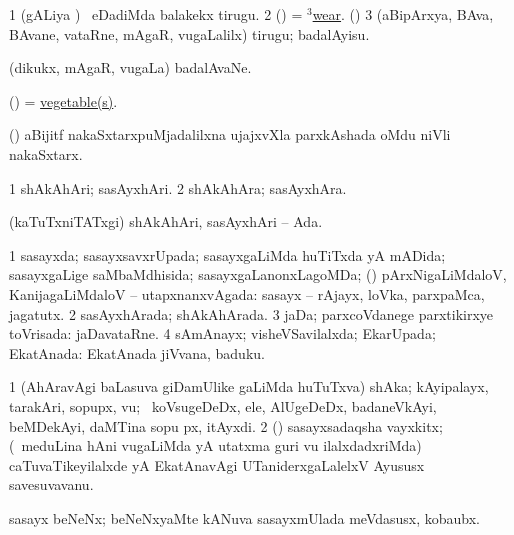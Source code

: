 \bentry
{} 
\gl{\akirx}
\expl{}
\bmng
\bnum
\num{1} (gALiya \vi) \kanmu\ eDadiMda balakekx tirugu. 
\num{2} (\nw) = \hyperref{kandict_w.pdf}{W}{wear(3)}{$^3$wear}. (\akirx) 
\num{3} (aBipArxya, BAva, BAvane, vataRne, mAgaR, \mo vugaLalilx) tirugu; badalAyisu. 
\enum
\emng
\eentry

\bentry
{} 
\gl{\nA}
\expl{}
\bmng
 (dikukx, mAgaR, \mo vugaLa) badalAvaNe. 
\emng
\eentry

\bentry
{} 
\gl{\nA}
\expl{}
\bmng
 (\AmA) = \hyperlink{vegetable(1)}{vegetable(s)}. 
\emng
\eentry

\bentry
{} 
\gl{\nA}
\expl{}
\bmng
 (\Kavi) aBijitf nakaSxtarxpuMjadalilxna ujajxvXla parxkAshada oMdu niVli nakaSxtarx. 
\emng
\eentry

\bentry
{} 
\gl{\nA}
\expl{}
\bmng
\bnum
\num{1} shAkAhAri; sasAyxhAri. 
\num{2} shAkAhAra; sasAyxhAra. 
\enum
\emng
\eentry

\bentry
{} 
\gl{\gu}
\expl{}
\bmng
 (kaTuTxniTATxgi) shAkAhAri, sasAyxhAri -- Ada. 
\emng
\eentry

\bentry
{} 
\gl{\gu}
\expl{}
\bmng
\bnum
\num{1} sasayxda; sasayxsavxrUpada; sasayxgaLiMda huTiTxda yA mADida; sasayxgaLige saMbaMdhisida; sasayxgaLanonxLagoMDa; (\kanmu) pArxNigaLiMdaloV, KanijagaLiMdaloV -- utapxnanxvAgada:  sasayx -- rAjayx, loVka, parxpaMca, jagatutx. 
\num{2} sasAyxhArada; shAkAhArada. 
\num{3} jaDa; parxcoVdanege parxtikirxye toVrisada:  jaDavataRne. 
\num{4} sAmAnayx; visheVSavilalxda; EkarUpada; EkatAnada:  EkatAnada jiVvana, baduku. 
\enum
\emng
\eentry

\bentry
{} 
\gl{\nA}
\expl{}
\bmng
\bnum
\num{1} (AhAravAgi baLasuva giDamUlike gaLiMda huTuTxva) shAka; kAyipalayx, tarakAri, sopupx, \mo vu; \udA\, koVsugeDeDx, ele, AlUgeDeDx, badaneVkAyi, beMDekAyi, daMTina sopu px, itAyxdi. 
\num{2} (\AmA) sasayxsadaqsha vayxkitx; (\kanmu\ meduLina hAni \mo vugaLiMda yA utatxma guri \mo vu ilalxdadxriMda) caTuvaTikeyilalxde yA EkatAnavAgi UTaniderxgaLalelxV Ayususx savesuvavanu. 
\enum
\emng
\eentry

\bentry
{}
\gl{\nA}
\expl{}
\bmng
 sasayx beNeNx; beNeNxyaMte kANuva sasayxmUlada meVdasusx, kobaubx. 
\emng
\eentry

